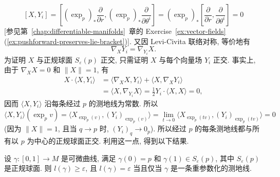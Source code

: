 \[
  [X,Y_i]=\left[(\exp_p)_*\frac{\partial}{\partial r},(\exp_p)_*\frac{\partial}{\partial\theta^i}\right]
  =(\exp_p)_*\left[\frac{\partial}{\partial r},\frac{\partial}{\partial\theta^i}\right]=0
\]
[参见第~\ref{chap:differentiable-manifolds}~章的 Exercise~\ref{ex:vector-fields}(\ref{ex:pushforward-preserves-lie-bracket})]. 又因 Levi-Civita 联络对称, 等价地有
\[
  \nabla_XY_i=\nabla_{Y_i}X.
\]
为证明 $X$ 与正规球面 $S_\varepsilon(p)$ 正交, 只需证明 $X$ 与每个向量场 $Y_i$ 正交. 事实上, 由于 $\nabla_XX=0$ 和 $\lVert X\rVert=1$, 有
\begin{align*}
  X\cdot\langle X,Y_i\rangle
  &=\langle\nabla_XX,Y_i\rangle+\langle X,\nabla_XY_i\rangle\\
  &=\langle X,\nabla_{Y_i}X\rangle=\frac12Y_i\cdot\langle X,X\rangle=0,
\end{align*}
因而 $\langle X,Y_i\rangle$ 沿每条经过 $p$ 的测地线为常数. 所以
\[
  \langle X,Y_i\rangle(\exp_p v)
  =\bigl\langle X_{\exp_p(v)},(Y_i)_{\exp_p(v)}\bigr\rangle
  =\lim_{t\to0}\bigl\langle X_{\exp_p(tv)},(Y_i)_{\exp_p(tv)}\bigr\rangle=0
\]
(因为 $\lVert X\rVert=1$, 且当 $q\to p$ 时, $(Y_i)_q\to0_p$). 所以经过 $p$ 的每条测地线都与所有以 $p$ 为中心的正规球面正交. 利用这一点, 得到以下结果.

\begin{RiemannProposition}\label{prop:length-bound-from-normal-sphere}
设 $\gamma:[0,1]\to M$ 是可微曲线, 满足 $\gamma(0)=p$ 和 $\gamma(1)\in S_\varepsilon(p)$, 其中 $S_\varepsilon(p)$ 是正规球面. 则 $l(\gamma)\geq\varepsilon$, 且 $l(\gamma)=\varepsilon$ 当且仅当 $\gamma$ 是一条重参数化的测地线.
\end{RiemannProposition}

